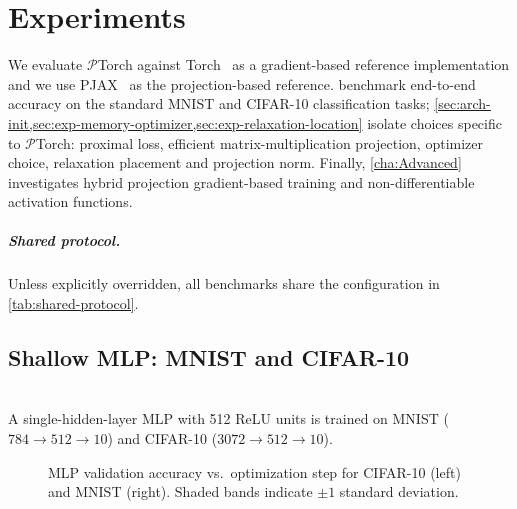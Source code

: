 \chapter{Experiments}
\label{sec:experiments}
We evaluate $\mathcal{P}$Torch against Torch~\cite{paszke2019pytorchimperativestylehighperformance} as a gradient-based reference implementation and we use PJAX~\cite{bergmeister2025projection} as the projection-based reference.  benchmark end-to-end accuracy on the standard MNIST and CIFAR-10 classification tasks; \cref{sec:arch-init,sec:exp-memory-optimizer,sec:exp-relaxation-location} isolate choices specific to $\mathcal{P}$Torch: proximal loss, efficient matrix-multiplication projection, optimizer choice, relaxation placement and projection norm. Finally, \cref{cha:Advanced} investigates hybrid projection gradient-based training and non-differentiable activation functions.

\paragraph{Shared protocol.}
Unless explicitly overridden, all benchmarks share the configuration in \cref{tab:shared-protocol}.


\section{Shallow MLP: MNIST and CIFAR-10}
\label{sec:exp-mlp}
\begin{tcolorbox}[reprocard, title=Setup]\\
A single-hidden-layer MLP with 512 ReLU units is trained on MNIST ($784 \to 512 \to 10$) and CIFAR-10 ($3072 \to 512 \to 10$).
\end{tcolorbox}

\begin{figure}[ht]
\centering
\begin{minipage}[t]{0.47\textwidth}
    \centering
\end{minipage}
\hfill
\begin{minipage}[t]{0.47\textwidth}
    \centering
\end{minipage}
\caption{MLP validation accuracy vs.\ optimization step for CIFAR-10 (left) and MNIST (right). Shaded bands indicate $\pm 1$ standard deviation.}
\label{fig:shallow-mlp-step}
\end{figure}

